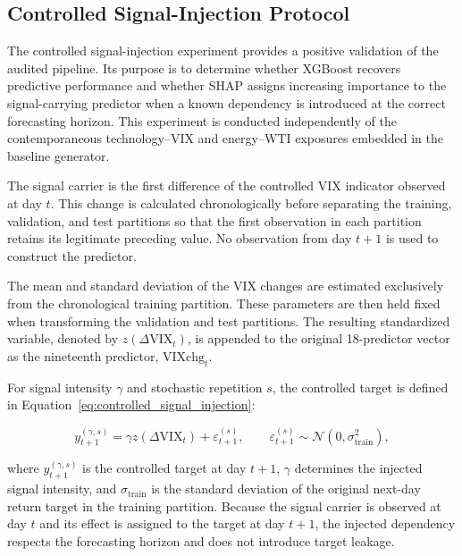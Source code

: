 \documentclass[utf8]{FrontiersinHarvard} %
\begin{document}
\subsection{Controlled Signal-Injection Protocol}
\label{subsec:signal_injection_protocol}

The controlled signal-injection experiment provides a positive validation of the audited pipeline. Its purpose is to determine whether XGBoost recovers predictive performance and whether SHAP assigns increasing importance to the signal-carrying predictor when a known dependency is introduced at the correct forecasting horizon. This experiment is conducted independently of the contemporaneous technology--VIX and energy--WTI exposures embedded in the baseline generator.

The signal carrier is the first difference of the controlled VIX indicator observed at day \(t\). This change is calculated chronologically before separating the training, validation, and test partitions so that the first observation in each partition retains its legitimate preceding value. No observation from day \(t+1\) is used to construct the predictor.

The mean and standard deviation of the VIX changes are estimated exclusively from the chronological training partition. These parameters are then held fixed when transforming the validation and test partitions. The resulting standardized variable, denoted by \(z(\Delta\mathrm{VIX}_t)\), is appended to the original 18-predictor vector as the nineteenth predictor, \(\mathrm{VIXchg}_t\).

For signal intensity \(\gamma\) and stochastic repetition \(s\), the controlled target is defined in Equation~\ref{eq:controlled_signal_injection}:

\begin{equation}
	y_{t+1}^{(\gamma,s)}
	=
	\gamma z\!\left(\Delta\mathrm{VIX}_t\right)
	+
	\varepsilon_{t+1}^{(s)},
	\qquad
	\varepsilon_{t+1}^{(s)}
	\sim
	\mathcal{N}\!\left(0,\sigma_{\mathrm{train}}^{2}\right),
	\label{eq:controlled_signal_injection}
\end{equation}

where \(y_{t+1}^{(\gamma,s)}\) is the controlled target at day \(t+1\), \(\gamma\) determines the injected signal intensity, and \(\sigma_{\mathrm{train}}\) is the standard deviation of the original next-day return target in the training partition. Because the signal carrier is observed at day \(t\) and its effect is assigned to the target at day \(t+1\), the injected dependency respects the forecasting horizon and does not introduce target leakage.
\end{document}
